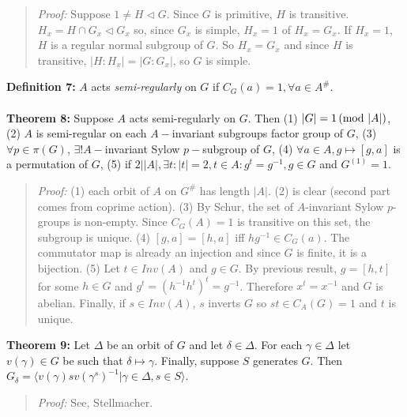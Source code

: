 \begin{quote}
\emph{Proof:}  
Suppose $1 \ne H \lhd G$.  Since $G$ is primitive, $H$ is transitive.  $H_x= H \cap G_x \lhd G_x$
so, since $G_x$ is simple,  $H_x = 1$ of $H_x= G_x$.  If $H_x=1$, $H$ is a regular normal subgroup
of $G$.  So $H_x = G_x$ and since $H$ is transitive, $|H:H_x|= |G:G_x|$, so $G$ is simple.
\end{quote}
{\bf Definition 7:} $A$ acts \emph{semi-regularly} on $G$ if $C_G(a)=1, \forall a \in A^{\#}$.  
\\
\\
{\bf Theorem 8:}
Suppose $A$ acts semi-regularly
on $G$.  Then (1) $|G| = 1 \thinspace \textnormal{(mod } |A| \textnormal{)}$, (2) $A$ is semi-regular on each $A-$invariant
subgroups factor group of $G$, (3) $\forall p \in \pi(G)$, $\exists! A-$invariant
Sylow $p-$subgroup of $G$, (4) $\forall a \in A, g \mapsto [g,a]$ is a permutation of
$G$, (5) if $2 | |A|, \exists t: |t|=2, t \in A: g^t = g^{-1}, g \in G$ and
$G^{(1)}=1$.
\begin{quote}
\emph{Proof:}  
(1) each orbit of $A$ on $G^{\#}$ has length $|A|$.  (2) is clear (second part comes from coprime action).
(3) By Schur, the set of $A$-invariant Sylow $p$-groups is non-empty.  Since $C_G(A)= 1$ is transitive on this
set, the subgroup is unique. (4) $[g,a]= [h,a]$ iff $h g^{-1} \in C_G(a)$.  The commutator map is already an
injection and since $G$ is finite, it is a bijection. (5)  Let $t \in Inv(A)$ and $g \in G$.  By previous result,
$g= [h,t]$ for some $h \in G$ and $g^t = (h^{-1} h^t)^t= g^{-1}$.  Therefore $x^t =x^{-1}$ and $G$ is abelian.
Finally, if $s \in Inv(A)$, $s$ inverts $G$ so $st \in C_A(G)=1$ and $t$ is unique.
\end{quote}
{\bf Theorem 9:}
Let $\Delta$ be an orbit of $G$ and let $\delta \in \Delta$.  For each $\gamma \in \Delta$
let $v(\gamma ) \in G$ be such that $\delta \mapsto \gamma$.  Finally, suppose $S$
generates $G$.  
Then $G_{\delta}= \langle v(\gamma)sv(\gamma^{s})^{-1} | \gamma \in \Delta, s \in S \rangle$.
\begin{quote}
\emph{Proof:}  
See, Stellmacher.
\end{quote}
